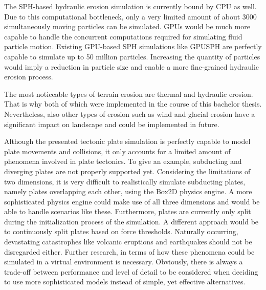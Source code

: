 \documentclass[11pt,a4paper,twoside,openright]{report}
\begin{document}
The SPH-based hydraulic erosion simulation is currently bound by CPU as well. Due to this computational bottleneck, only a very limited amount of about 3000 simultaneously moving particles can be simulated. GPUs would be much more capable to handle the concurrent computations required for simulating fluid particle motion. Existing GPU-based SPH simulations like GPUSPH \cite{GPUSPH:2008} are perfectly capable to simulate up to 50 million particles. Increasing the quantity of particles would imply a reduction in particle size and enable a more fine-grained hydraulic erosion process.

The most noticeable types of terrain erosion are thermal and hydraulic erosion. That is why both of which were implemented in the course of this bachelor thesis. Nevertheless, also other types of erosion such as wind and glacial erosion have a significant impact on landscape and could be implemented in future.

Although the presented tectonic plate simulation is perfectly capable to model plate movements and collisions, it only accounts for a limited amount of phenomena involved in plate tectonics. To give an example, subducting and diverging plates are not properly supported yet. Considering the limitations of two dimensions, it is very difficult to realistically simulate subducting plates, namely plates overlapping each other, using the Box2D physics engine. A more sophisticated physics engine could make use of all three dimensions and would be able to handle scenarios like these. Furthermore, plates are currently only split during the initialization process of the simulation. A different approach would be to continuously split plates based on force thresholds. Naturally occurring, devastating catastrophes like volcanic eruptions and earthquakes should not be disregarded either. Further research, in terms of how these phenomena could be simulated in a virtual environment is necessary. Obviously, there is always a trade-off between performance and level of detail to be considered when deciding to use more sophisticated models instead of simple, yet effective alternatives.
\end{document}
